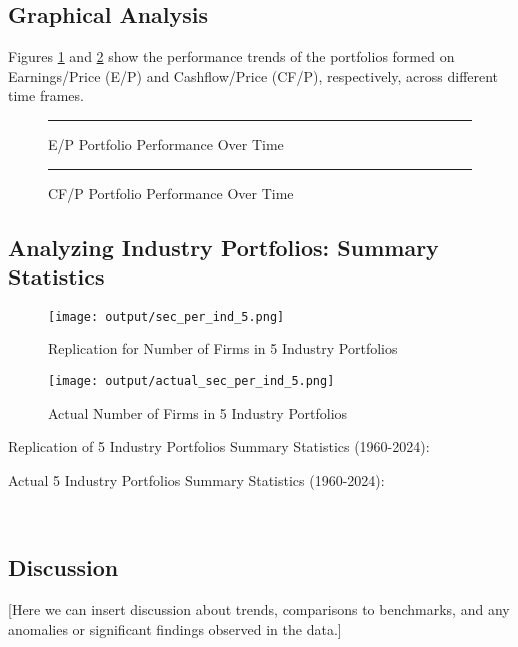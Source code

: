 \documentclass{article}
\begin{document}
\subsection*{Graphical Analysis}

Figures \ref{fig:graph1} and \ref{fig:graph2} show the performance trends of the portfolios formed on Earnings/Price (E/P) and Cashflow/Price (CF/P), respectively, across different time frames.

\begin{figure}[ht]
\centering
\rule{0.8\textwidth}{0.4\textwidth} %
\caption{E/P Portfolio Performance Over Time}
\label{fig:graph1}
\end{figure}

\begin{figure}[ht]
\centering
\rule{0.8\textwidth}{0.4\textwidth} %
\caption{CF/P Portfolio Performance Over Time}
\label{fig:graph2}
\end{figure}

\subsection*{Analyzing Industry Portfolios: Summary Statistics}
\begin{figure}[]
  \centering
  \texttt{[image: output/sec\_per\_ind\_5.png]}
  \caption{Replication for Number of Firms in 5 Industry Portfolios}
  \texttt{[image: output/actual\_sec\_per\_ind\_5.png]}
  \caption{Actual Number of Firms in 5 Industry Portfolios}
\end{figure}

\pagebreak
Replication of 5 Industry Portfolios Summary Statistics (1960-2024):\\
\begin{center}
  
\end{center}

Actual 5 Industry Portfolios Summary Statistics (1960-2024):
\begin{center}
  \\  
\end{center}



\subsection*{Discussion}

[Here we can insert discussion about trends, comparisons to benchmarks, and any anomalies or significant findings observed in the data.]
\end{document}

